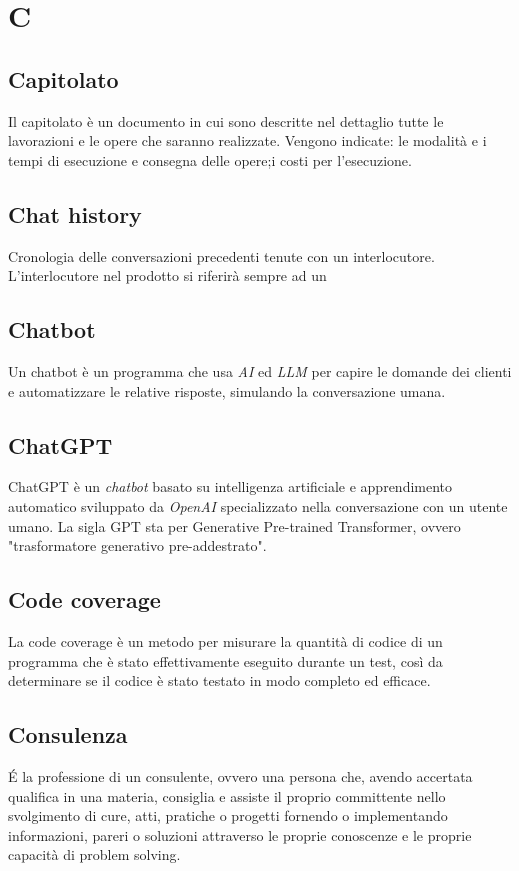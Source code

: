 \chapter{C}

\section{Capitolato}
Il capitolato è un documento in cui sono descritte nel dettaglio tutte le lavorazioni e le opere che saranno realizzate. Vengono indicate: le modalità e i tempi di esecuzione e consegna delle opere;i costi per l'esecuzione.

\section{Chat history}
Cronologia delle conversazioni precedenti tenute con un interlocutore. L'interlocutore nel prodotto si riferirà sempre ad un 

\section{Chatbot}
Un chatbot è un programma che usa \emph{AI} ed \emph{LLM} per capire le domande dei clienti e automatizzare le relative risposte, simulando la conversazione umana.

\section{ChatGPT}
ChatGPT è un \emph{chatbot} basato su intelligenza artificiale e apprendimento automatico sviluppato da \emph{OpenAI} specializzato nella conversazione con un utente umano. La sigla GPT sta per Generative Pre-trained Transformer, ovvero "trasformatore generativo pre-addestrato". 

\section{Code coverage}
La code coverage è un metodo per misurare la quantità di codice di un programma che è stato effettivamente eseguito durante un test, così da determinare se il codice è stato testato in modo completo ed efficace.

\section{Consulenza}
É la professione di un consulente, ovvero una persona che, avendo accertata qualifica in una materia, consiglia e assiste il proprio committente nello svolgimento di cure, atti, pratiche o progetti fornendo o implementando informazioni, pareri o soluzioni attraverso le proprie conoscenze e le proprie capacità di problem solving.

